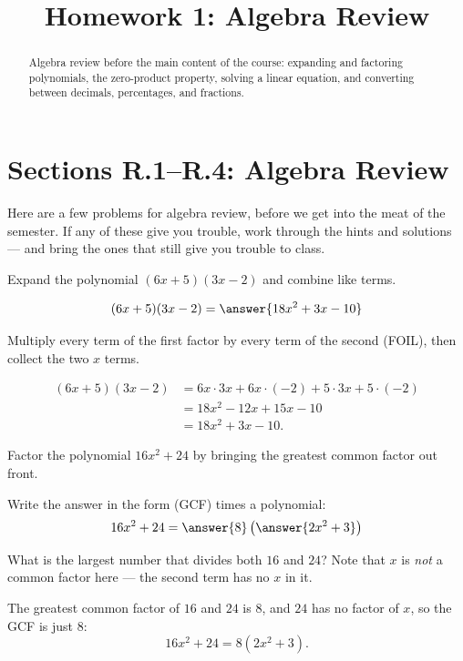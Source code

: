 \documentclass[12pt]{ximera}
\title{Homework 1: Algebra Review}
\begin{document}
\begin{abstract}
Algebra review before the main content of the course: expanding and factoring
polynomials, the zero-product property, solving a linear equation, and converting
between decimals, percentages, and fractions.
\end{abstract}
\maketitle

\section*{Sections R.1--R.4: Algebra Review}

Here are a few problems for algebra review, before we get into the meat of the
semester. If any of these give you trouble, work through the hints and solutions ---
and bring the ones that still give you trouble to class.

\begin{problem}
Expand the polynomial $(6x+5)(3x-2)$ and combine like terms.

\[ (6x+5)(3x-2) = \answer{18x^2+3x-10} \]

\begin{hint}
Multiply every term of the first factor by every term of the second (FOIL), then
collect the two $x$ terms.
\end{hint}

\begin{feedback}
\begin{align*}
(6x+5)(3x-2) &= 6x\cdot 3x + 6x\cdot(-2) + 5\cdot 3x + 5\cdot(-2)\\
             &= 18x^2 - 12x + 15x - 10\\
             &= 18x^2 + 3x - 10.
\end{align*}
\end{feedback}
\end{problem}

\begin{problem}
Factor the polynomial $16x^2+24$ by bringing the greatest common factor out front.

Write the answer in the form (GCF) times a polynomial:
\[ 16x^2 + 24 = \answer{8}\left(\answer{2x^2+3}\right) \]

\begin{hint}
What is the largest number that divides both $16$ and $24$? Note that $x$ is
\emph{not} a common factor here --- the second term has no $x$ in it.
\end{hint}

\begin{feedback}
The greatest common factor of $16$ and $24$ is $8$, and $24$ has no factor of $x$,
so the GCF is just $8$:
\[ 16x^2 + 24 = 8\left(2x^2 + 3\right). \]
\end{feedback}
\end{problem}
\end{document}
